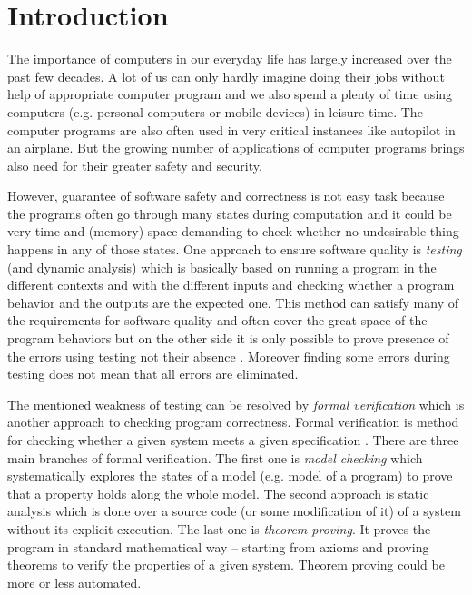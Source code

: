 \chapter{Introduction}
The importance of computers in our everyday life has largely increased over the past few decades.
A lot of us can only hardly imagine doing their jobs without help of appropriate computer program
and we also spend a plenty of time using computers (e.g. personal computers or mobile devices) in leisure time.
The computer programs are also often used in very critical instances like autopilot in an airplane.
But the growing number of applications of computer programs brings also need for their greater safety and security.

However, guarantee of software safety and correctness is not easy task
because the programs often go through many states during computation
and it could be very time and (memory) space demanding to check whether no undesirable thing
happens in any of those states.
One approach to ensure software quality is \emph{testing} (and dynamic analysis) which is basically based
on running a program in the different contexts and with the different inputs
and checking whether a program behavior and the outputs are the expected one.
This method can satisfy many of the requirements for software quality and often cover the great space of the program behaviors
but on the other side it is only possible to prove presence of the errors using testing not their absence \cite{dijkstra}.
Moreover finding some errors during testing does not mean that all errors are eliminated.

The mentioned weakness of testing can be resolved by \emph{formal verification}
which is another approach to checking program correctness.
Formal verification is method for checking whether a given system meets a given specification \cite{fav:lecture}.
There are three main branches of formal verification.
The first one is \emph{model checking} which systematically explores the states of a model (e.g. model of a program) to
prove that a property holds along the whole model.
The second approach is static analysis which is done over a source code (or some modification of it) of a system
without its explicit execution.
The last one is \emph{theorem proving}.
It proves the program in standard mathematical way -- starting from axioms and proving theorems to
verify the properties of a given system.
Theorem proving could be more or less automated.

